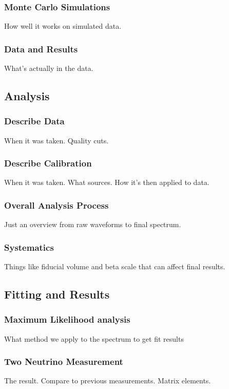 \documentclass[12pt,letterpaper,onecolumn]{article}
\begin{document}
\subsubsection{Monte Carlo Simulations}
How well it works on simulated data.

\subsubsection{Data and Results}
What's actually in the data.

\subsection{Analysis}

\subsubsection{Describe Data}
When it was taken. Quality cuts.

\subsubsection{Describe Calibration}
When it was taken. What sources. How it's then applied to data.

\subsubsection{Overall Analysis Process}
Just an overview from raw waveforms to final spectrum.

\subsubsection{Systematics}
Things like fiducial volume and beta scale that can affect final results.

\subsection{Fitting and Results}

\subsubsection{Maximum Likelihood analysis}
What method we apply to the spectrum to get fit results

\subsubsection{Two Neutrino Measurement}
The result. Compare to previous measurements. Matrix elements.
\end{document}
